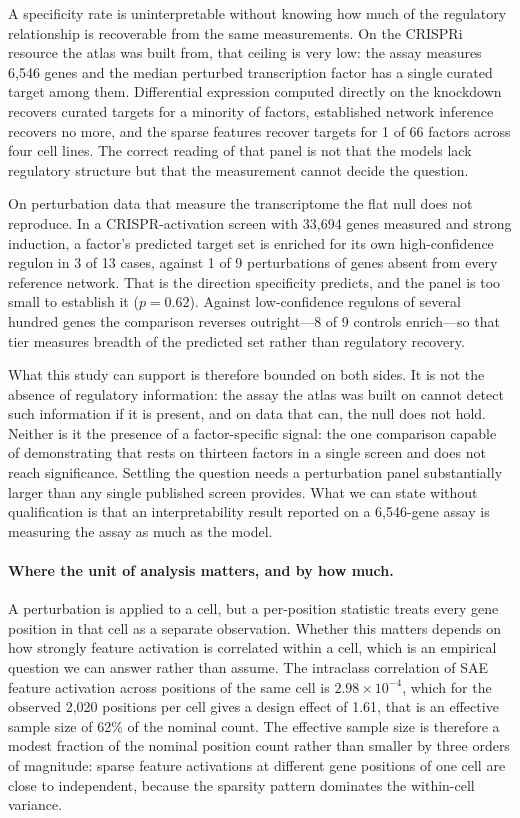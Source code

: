 \documentclass[onecolumn,11pt]{article}
\begin{document}
A specificity rate is uninterpretable without knowing how much of the regulatory relationship is
recoverable from the same measurements. On the CRISPRi resource the atlas was built from, that
ceiling is very low: the assay measures 6,546 genes and the median perturbed transcription factor
has a single curated target among them. Differential expression computed directly on the knockdown
recovers curated targets for a minority of factors, established network inference recovers no more,
and the sparse features recover targets for 1 of 66 factors across four cell lines. The correct reading of that panel
is not that the models lack regulatory structure but that the measurement cannot decide the
question.

On perturbation data that measure the transcriptome the flat null does not reproduce. In a
CRISPR-activation screen with 33,694 genes measured and strong induction, a factor's predicted
target set is enriched for its own high-confidence regulon in 3 of 13 cases, against 1 of 9
perturbations of genes absent from every reference network. That is the direction specificity
predicts, and the panel is too small to establish it ($p = 0.62$). Against low-confidence regulons
of several hundred genes the comparison reverses outright---8 of 9 controls enrich---so that tier
measures breadth of the predicted set rather than regulatory recovery.

What this study can support is therefore bounded on both sides. It is not the absence of regulatory
information: the assay the atlas was built on cannot detect such information if it is present, and
on data that can, the null does not hold. Neither is it the presence of a factor-specific signal:
the one comparison capable of demonstrating that rests on thirteen factors in a single screen and
does not reach significance. Settling the question needs a perturbation panel substantially larger
than any single published screen provides. What we can state without qualification is that an
interpretability result reported on a 6,546-gene assay is measuring the assay as much as the
model.

\paragraph{Where the unit of analysis matters, and by how much.}
A perturbation is applied to a cell, but a per-position statistic treats every gene position in
that cell as a separate observation. Whether this matters depends on how strongly feature
activation is correlated within a cell, which is an empirical question we can answer rather than
assume. The intraclass correlation of SAE feature activation across positions of the same cell is
$2.98 \times 10^{-4}$, which for the observed 2,020 positions per cell gives a design
effect of 1.61, that is an effective sample size of 62\% of the nominal count. The effective sample size is therefore a modest fraction of the
nominal position count rather than smaller by three orders of magnitude: sparse feature activations
at different gene positions of one cell are close to independent, because the sparsity pattern
dominates the within-cell variance.
\end{document}
